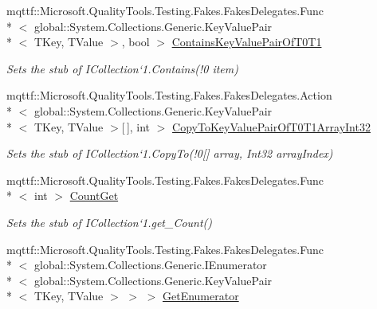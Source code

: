 \begin{DoxyCompactItemize}
mqttf\-::\-Microsoft.\-Quality\-Tools.\-Testing.\-Fakes.\-Fakes\-Delegates.\-Func\\*
$<$ global\-::\-System.\-Collections.\-Generic.\-Key\-Value\-Pair\\*
$<$ T\-Key, T\-Value $>$, bool $>$ \hyperlink{class_system_1_1_collections_1_1_generic_1_1_fakes_1_1_stub_i_dictionary_3_01_t_key_00_01_t_value_01_4_abfb262ea0260154a9ef91fd321b2b46a}{Contains\-Key\-Value\-Pair\-Of\-T0\-T1}
\begin{DoxyCompactList}\small\item\em Sets the stub of I\-Collection`1.Contains(!0 item)\end{DoxyCompactList}\item 
mqttf\-::\-Microsoft.\-Quality\-Tools.\-Testing.\-Fakes.\-Fakes\-Delegates.\-Action\\*
$<$ global\-::\-System.\-Collections.\-Generic.\-Key\-Value\-Pair\\*
$<$ T\-Key, T\-Value $>$\mbox{[}$\,$\mbox{]}, int $>$ \hyperlink{class_system_1_1_collections_1_1_generic_1_1_fakes_1_1_stub_i_dictionary_3_01_t_key_00_01_t_value_01_4_aca5bb22399a133c03eb8426e329983c0}{Copy\-To\-Key\-Value\-Pair\-Of\-T0\-T1\-Array\-Int32}
\begin{DoxyCompactList}\small\item\em Sets the stub of I\-Collection`1.Copy\-To(!0\mbox{[}\mbox{]} array, Int32 array\-Index)\end{DoxyCompactList}\item 
mqttf\-::\-Microsoft.\-Quality\-Tools.\-Testing.\-Fakes.\-Fakes\-Delegates.\-Func\\*
$<$ int $>$ \hyperlink{class_system_1_1_collections_1_1_generic_1_1_fakes_1_1_stub_i_dictionary_3_01_t_key_00_01_t_value_01_4_aa17f4c7cc3994b00dc7ee67fac73754b}{Count\-Get}
\begin{DoxyCompactList}\small\item\em Sets the stub of I\-Collection`1.get\-\_\-\-Count()\end{DoxyCompactList}\item 
mqttf\-::\-Microsoft.\-Quality\-Tools.\-Testing.\-Fakes.\-Fakes\-Delegates.\-Func\\*
$<$ global\-::\-System.\-Collections.\-Generic.\-I\-Enumerator\\*
$<$ global\-::\-System.\-Collections.\-Generic.\-Key\-Value\-Pair\\*
$<$ T\-Key, T\-Value $>$ $>$ $>$ \hyperlink{class_system_1_1_collections_1_1_generic_1_1_fakes_1_1_stub_i_dictionary_3_01_t_key_00_01_t_value_01_4_a13b79991b9dc339f20f79b3454b35356}{Get\-Enumerator}

\end{DoxyCompactItemize}
